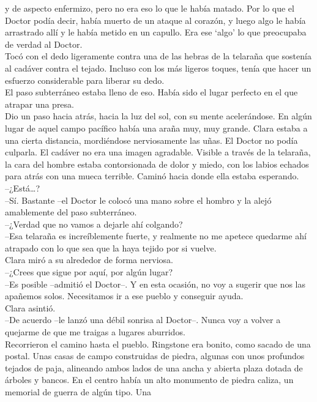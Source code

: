 y de aspecto enfermizo, pero no era eso lo que le había matado. Por lo
que el Doctor podía decir, había muerto de un ataque al corazón, y luego
algo le había arrastrado allí y le había metido en un capullo. Era ese
`algo' lo que preocupaba de verdad al Doctor.\\
Tocó con el dedo ligeramente contra una de las hebras de la telaraña que
sostenía al cadáver contra el tejado. Incluso con los más ligeros
toques, tenía que hacer un esfuerzo considerable para liberar su dedo.\\
El paso subterráneo estaba lleno de eso. Había sido el lugar perfecto en
el que atrapar una presa.\\
Dio un paso hacia atrás, hacia la luz del sol, con su mente
acelerándose. En algún lugar de aquel campo pacífico había una araña
muy, muy grande. Clara estaba a una cierta distancia, mordiéndose
nerviosamente las uñas. El Doctor no podía culparla. El cadáver no era
una imagen agradable. Visible a través de la telaraña, la cara del
hombre estaba contorsionada de dolor y miedo, con los labios echados
para atrás con una mueca terrible. Caminó hacia donde ella estaba
esperando.\\
--¿Está\ldots{}?\\
--Sí. Bastante --el Doctor le colocó una mano sobre el hombro y la alejó
amablemente del paso subterráneo.\\
--¿Verdad que no vamos a dejarle ahí colgando?\\
--Esa telaraña es increíblemente fuerte, y realmente no me apetece
quedarme ahí atrapado con lo que sea que la haya tejido por si vuelve.\\
Clara miró a su alrededor de forma nerviosa.\\
--¿Crees que sigue por aquí, por algún lugar?\\
--Es posible --admitió el Doctor--. Y en esta ocasión, no voy a sugerir
que nos las apañemos solos. Necesitamos ir a ese pueblo y conseguir
ayuda.\\
Clara asintió.\\
--De acuerdo --le lanzó una débil sonrisa al Doctor--. Nunca voy a
volver a quejarme de que me traigas a lugares aburridos.\\
Recorrieron el camino hasta el pueblo. Ringstone era bonito, como sacado
de una postal. Unas casas de campo construidas de piedra, algunas con
unos profundos tejados de paja, alineando ambos lados de una ancha y
abierta plaza dotada de árboles y bancos. En el centro había un alto
monumento de piedra caliza, un memorial de guerra de algún tipo. Una
